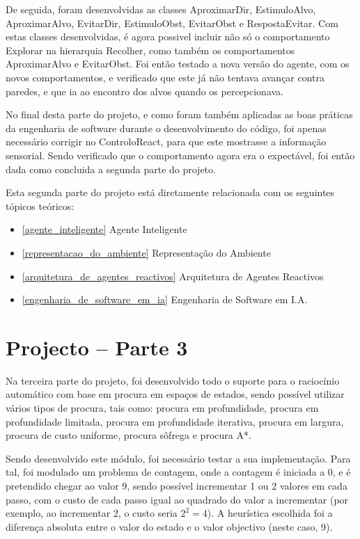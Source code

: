 \documentclass[a4paper,12pt]{article}
\begin{document}
De seguida, foram desenvolvidas as classes AproximarDir, EstimuloAlvo, AproximarAlvo, EvitarDir, EstimuloObst, EvitarObst e RespostaEvitar.
Com estas classes desenvolvidas, é agora possivel incluir não só o comportamento Explorar na hierarquia Recolher, como também os comportamentos AproximarAlvo e EvitarObst. Foi então testado a nova versão do agente, com os novos comportamentos, e verificado que este já não tentava avançar contra paredes, e que ia ao encontro dos alvos quando os percepcionava.

No final desta parte do projeto, e como foram também aplicadas as boas práticas da engenharia de software durante o desenvolvimento do código, foi apenas necessário corrigir no ControloReact, para que este mostrasse a informação sensorial.
Sendo verificado que o comportamento agora era o expectável, foi então dada como concluida a segunda parte do projeto.

Esta segunda parte do projeto está diretamente relacionada com os seguintes tópicos teóricos:

\begin{itemize}
	\item \ref{agente_inteligente} Agente Inteligente
	\item \ref{representacao_do_ambiente} Representação do Ambiente
	\item \ref{arquitetura_de_agentes_reactivos} Arquitetura de Agentes Reactivos
	\item \ref{engenharia_de_software_em_ia} Engenharia de Software em I.A.
\end{itemize}

\newpage
\section{Projecto – Parte 3}
Na terceira parte do projeto, foi desenvolvido todo o suporte para o raciocínio automático com base em procura em espaços de estados, sendo possível utilizar vários tipos de procura, tais como: procura em profundidade, procura em profundidade limitada, procura em profundidade iterativa, procura em largura, procura de custo uniforme, procura sôfrega e procura A*.

Sendo desenvolvido este módulo, foi necessário testar a sua implementação. Para tal, foi modulado um problema de contagem, onde a contagem é iniciada a 0, e é pretendido chegar ao valor 9, sendo possível incrementar 1 ou 2 valores em cada passo, com o custo de cada passo igual ao quadrado do valor a incrementar (por exemplo, ao incrementar 2, o custo seria \(2^2=4\)).
A heurística escolhida foi a diferença absoluta entre o valor do estado e o valor objectivo (neste caso, 9).
\end{document}
